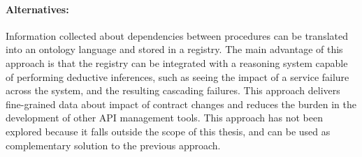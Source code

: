 \paragraph{Alternatives:}
Information collected about dependencies between procedures can be translated into an ontology language \cite{ontology} and stored in a registry.
The main advantage of this approach is that the registry can be integrated with a reasoning system capable of performing deductive inferences, such as
seeing the impact of a service failure across the system, and the resulting cascading failures.
This approach delivers fine-grained data about impact of contract changes and reduces the burden in the development of other API management tools.
This approach has not been explored because it falls outside the scope of this thesis, and can be used as complementary solution to the previous approach.

